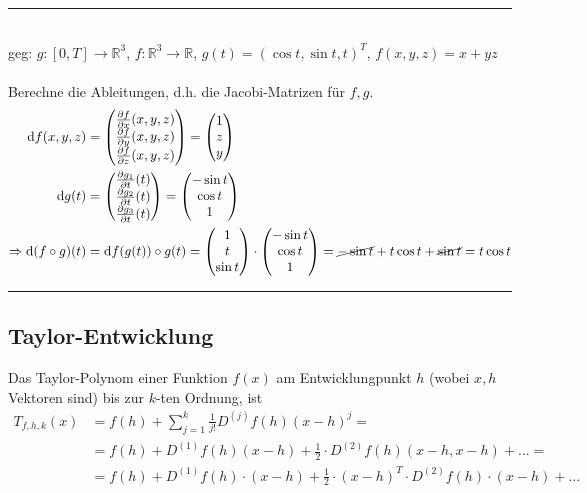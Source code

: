 \documentclass{article}
\newcommand{\diff}{\mathrm{d}}
\begin{document}
{\color{blue}
\hrule
	\\
	geg: $g:[0,T]\to \mathbb{R}^3$, $f:\mathbb{R}^3\to \mathbb{R}$, $g(t) = (\cos t, \sin t, t)^T$, $f(x,y,z) = x + yz$\\
	\\
	Berechne die Ableitungen, d.h. die Jacobi-Matrizen für $f,g$.
		\begin{align*}
			\diff f(x,y,z) &=
			\begin{pmatrix}
				\frac{\partial f}{\partial x}(x,y,z) \\
				\frac{\partial f}{\partial y}(x,y,z) \\
				\frac{\partial f}{\partial z}(x,y,z)
			\end{pmatrix}
			=
			\begin{pmatrix}
				1 \\
				z \\
				y
			\end{pmatrix} \\
			\diff g(t) &=
			\begin{pmatrix}
				\frac{\partial g_1}{\partial t}(t) \\
				\frac{\partial g_2}{\partial t}(t) \\
				\frac{\partial g_3}{\partial t}(t)
			\end{pmatrix}
			=
			\begin{pmatrix}
				-\sin t\\
				\cos t\\
				1
			\end{pmatrix} \\
			\Rightarrow \diff(f\circ g)(t) &= \diff f(g(t)) \circ g(t) =
			\begin{pmatrix}
				1\\
				t\\
				\sin t
			\end{pmatrix}
			\cdot
			\begin{pmatrix}
				-\sin t\\
				\cos t\\
				1
			\end{pmatrix}
			=
			\cancel{-\sin t} + t\cos t + \cancel{\sin t} = t\cos t
		\end{align*}
\hrule
}


\newpage


\subsection{Taylor-Entwicklung}
Das Taylor-Polynom einer Funktion $f(x)$ am Entwicklungpunkt $h$ \textcolor{gruen}{(wobei $x,h$ Vektoren sind)} bis zur $k$-ten Ordnung, ist
	\begin{align}
		T_{f,h,k}(x) &= f(h) + \sum_{j=1}^k \frac{1}{j!} D^{(j)}f(h)(x-h)^j = \\
		&= f(h) + D^{(1)}f(h)(x-h) + \frac{1}{2} \cdot D^{(2)}f(h)(x-h,x-h) + ... = \\
		&= f(h) + D^{(1)}f(h)\cdot (x-h) + \frac{1}{2} \cdot  (x-h)^T \cdot D^{(2)}f(h) \cdot (x-h) + ...
	\end{align}
\end{document}
